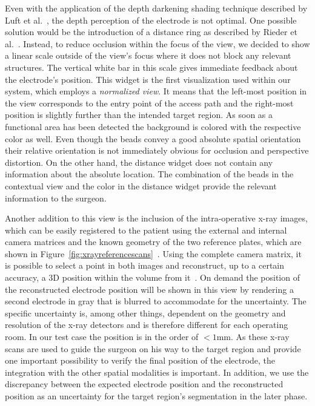 \documentclass[review]{vgtc}                 %
\begin{document}
Even with the application of the depth darkening shading technique described by Luft et al.~\cite{Luft2005}, the depth perception of the electrode is not optimal. One possible solution would be the introduction of a distance ring as described by Rieder et al.~\cite{Rieder2008}. Instead, to reduce occlusion within the focus of the view, we decided to show a linear scale outside of the view's focus where it does not block any relevant structures. The vertical white bar in this scale gives immediate feedback about the electrode's position. This widget is the first visualization used within our system, which employs a \emph{normalized view}. It means that the left-most position in the view corresponds to the entry point of the access path and the right-most position is slightly further than the intended target region. As soon as a functional area has been detected the background is colored with the respective color as well. Even though the beads convey a good absolute spatial orientation their relative orientation is not immediately obvious for occlusion and perspective distortion. On the other hand, the distance widget does not contain any information about the absolute location. The combination of the beads in the contextual view and the color in the distance widget provide the relevant information to the surgeon.

Another addition to this view is the inclusion of the intra-operative x-ray images, which can be easily registered to the patient using the external and internal camera matrices and the known geometry of the two reference plates, which are shown in Figure~\ref{fig:xrayreferencescans}~\cite{Caprile1990,Zheng2008}. Using the complete camera matrix, it is possible to select a point in both images and reconstruct, up to a certain accuracy, a 3D position within the volume from it~\cite{Hartley2004}. On demand the position of the reconstructed electrode position will be shown in this view by rendering a second electrode in gray that is blurred to accommodate for the uncertainty. The specific uncertainty is, among other things, dependent on the geometry and resolution of the x-ray detectors and is therefore different for each operating room. In our test case the position is in the order of $< 1$mm. As these x-ray scans are used to guide the surgeon on his way to the target region and provide one important possibility to verify the final position of the electrode, the integration with the other spatial modalities is important. In addition, we use the discrepancy between the expected electrode position and the reconstructed position as an uncertainty for the target region's segmentation in the later phase.
\end{document}
